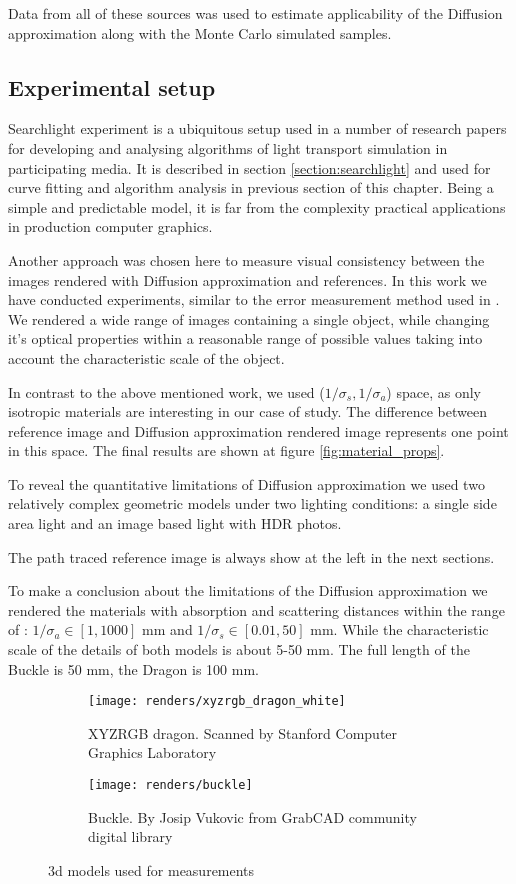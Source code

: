 Data from all of these sources was used to estimate applicability of the Diffusion approximation
along with the Monte Carlo simulated samples.

\subsection{Experimental setup}
Searchlight experiment is a ubiquitous setup used in a number of research papers for developing
and analysing algorithms of light transport simulation in participating media. It is described in
section \ref{section:searchlight} and used for curve fitting and algorithm analysis in previous
section of this chapter. Being a simple and predictable model, it is far from the complexity
practical applications in production computer graphics.

Another approach was chosen here to measure visual consistency between the images rendered with
Diffusion approximation and references. In this work we have conducted experiments, similar to the
error measurement method used in \cite{Zhao:2014:HSR:2601097.2601104}. We rendered a wide range of
images containing a single object, while changing it's optical properties within a reasonable range
of possible values taking into account the characteristic scale of the object.

In contrast to the above mentioned work, we used ($1/\sigma_s, 1/\sigma_a$) space, as only
isotropic materials are interesting in our case of study. The difference between reference image and
Diffusion approximation rendered image represents one point in this space. The final results are
shown at figure \ref{fig:material_props}.

To reveal the quantitative limitations of Diffusion approximation we used two relatively complex
geometric models under two lighting conditions: a single side area light and an image based light
with HDR photos.

The path traced reference image is always show at the left in the next sections.

To make a conclusion about the limitations of the Diffusion approximation we rendered the
materials with absorption and scattering distances within the range of : $1/\sigma_a \in
[1,1000]$ mm and $1/\sigma_s \in [0.01,50]$ mm. While the characteristic scale of the details of
both models is about 5-50 mm. The full length of the Buckle is 50 mm, the Dragon is 100 mm.

\begin{figure}[h]
    \centering
    \begin{subfigure}{0.48\textwidth}
        \texttt{[image: renders/xyzrgb\_dragon\_white]}
        \caption{XYZRGB dragon. Scanned by Stanford Computer Graphics Laboratory}
    \end{subfigure}
    \begin{subfigure}{0.48\textwidth}
        \texttt{[image: renders/buckle]}
        \caption{Buckle. By Josip Vukovic from GrabCAD community digital library}
    \end{subfigure}
    \caption{3d models used for measurements}
    \label{fig:measurements_models}
\end{figure}

